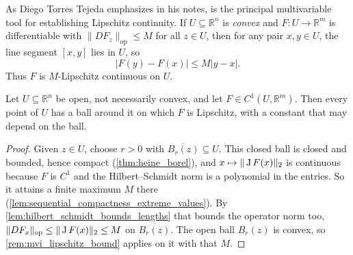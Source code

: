 \begin{center}
\end{center}

\begin{remark}
\label{rem:mvi_lipschitz_bound}
As Diego Torres Tejeda emphasizes in his notes,  is the principal multivariable tool for establishing Lipschitz continuity. If $U \subseteq \mathbb{R}^n$ is \emph{convex} and $F : U \to \mathbb{R}^m$ is differentiable with $\|DF_z\|_{\mathrm{op}} \leq M$ for all $z \in U$, then for any pair $x, y \in U$, the line segment $[x, y]$ lies in $U$, so
\[
|F(y) - F(x)| \leq M |y - x|.
\]
Thus $F$ is $M$-Lipschitz continuous on $U$.
\end{remark}

\begin{corollary}
\label{cor:c1_locally_lipschitz}
Let $U \subseteq \mathbb{R}^n$ be open, not necessarily convex, and let
$F \in C^1(U,\mathbb{R}^m)$. Then every point of $U$ has a ball around it on which $F$ is
Lipschitz, with a constant that may depend on the ball.
\end{corollary}

\begin{proof}
Given $z \in U$, choose $r > 0$ with $\overline{B_r(z)} \subseteq U$. This closed ball is closed
and bounded, hence compact (\cref{thm:heine_borel}), and $x \mapsto \|\operatorname{J} F(x)\|_2$ is
continuous because $F$ is $C^1$ and the Hilbert--Schmidt norm is a polynomial in the entries. So
it attains a finite maximum $M$ there (\cref{lem:sequential_compactness_extreme_values}). By
\cref{lem:hilbert_schmidt_bounds_lengths} that bounds the operator norm too,
$\|DF_x\|_{\mathrm{op}} \leq \|\operatorname{J} F(x)\|_2 \leq M$ on $\overline{B_r(z)}$. The open ball
$B_r(z)$ is convex, so \cref{rem:mvi_lipschitz_bound} applies on it with that $M$.
\end{proof}


